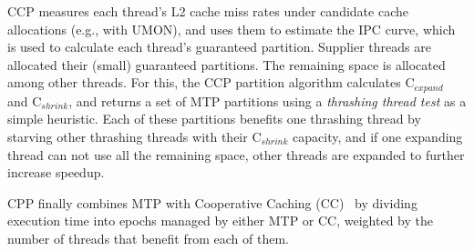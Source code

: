 CCP measures each thread's L2 cache miss rates under candidate cache allocations (e.g., with UMON), and uses them to estimate the IPC curve, which is used to calculate each thread's guaranteed partition. 
Supplier threads are allocated their (small) guaranteed partitions.
The remaining space is allocated among other threads.
For this, the CCP partition algorithm calculates C$_{expand}$ and C$_{shrink}$, and returns a set of MTP partitions using a \textit{thrashing thread test} as a simple heuristic.
Each of these partitions benefits one thrashing thread by starving other thrashing threads with their C$_{shrink}$ capacity, and if one expanding thread can not use all the remaining space, other threads are expanded to further increase speedup. 

CPP finally combines MTP with Cooperative Caching (CC)~\cite{chang06} by dividing execution time into epochs managed by either MTP or CC, weighted by the number of threads that benefit from each of them.
